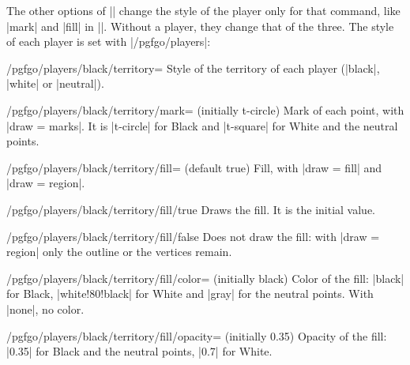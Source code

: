 	The other options of |\territory| change the style of the player only for that command, like |mark| and |fill| in ||. Without a player, they change that of the three. The style of each player is set with |/pgfgo/players|:

	\begin{key}{/pgfgo/players/black/territory=}
		Style of the territory of each player (|black|, |white| or |neutral|).
	\end{key}

	\begin{key}{/pgfgo/players/black/territory/mark= (initially t-circle)}
		Mark of each point, with |draw = marks|. It is |t-circle| for Black and |t-square| for White and the neutral points.

		\begin{codeexample}[]
			\begin{goban}[5]
			\end{goban}
		\end{codeexample}
	\end{key}

	\begin{key}{/pgfgo/players/black/territory/fill= (default true)}
		Fill, with |draw = fill| and |draw = region|.
	\end{key}

	\begin{key}{/pgfgo/players/black/territory/fill/true}
		Draws the fill. It is the initial value.
	\end{key}

	\begin{key}{/pgfgo/players/black/territory/fill/false}
		Does not draw the fill: with |draw = region| only the outline or the vertices remain.
	\end{key}

	\begin{key}{/pgfgo/players/black/territory/fill/color= (initially black)}
		Color of the fill: |black| for Black, |white!80!black| for White and |gray| for the neutral points. With |none|, no color.
	\end{key}

	\begin{key}{/pgfgo/players/black/territory/fill/opacity= (initially 0.35)}
		Opacity of the fill: |0.35| for Black and the neutral points, |0.7| for White.

		\begin{codeexample}[]
			\begin{goban}[5]
			\end{goban}
		\end{codeexample}
	\end{key}

